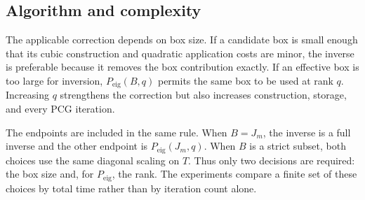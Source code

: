 

\subsection{Algorithm and complexity}
\label{subsec:algorithm-cost-summary}

The applicable correction depends on box size. If a candidate box is small
enough that its cubic construction and quadratic application costs are minor,
the inverse is preferable because it removes the box contribution exactly. If
an effective box is too large for inversion, \(P_{\mathrm{eig}}(B,q)\) permits
the same box to be used at rank \(q\). Increasing \(q\) strengthens the correction but
also increases construction, storage, and every PCG iteration.

The endpoints are included in the same rule. When \(B=J_m\), the inverse is a
full inverse and the other endpoint is \(P_{\mathrm{eig}}(J_m,q)\). When \(B\)
is a strict subset, both choices use the same diagonal scaling on \(T\). Thus
only two decisions are required: the box size and, for \(P_{\mathrm{eig}}\),
the rank. The experiments compare
a finite set of these choices by total time rather than by iteration count
alone.

